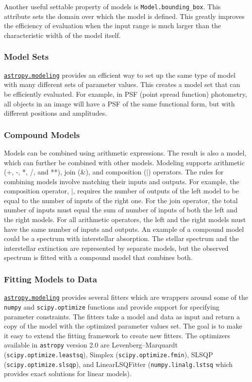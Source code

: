 \documentclass[modern]{aastex62}
\newcommand{\package}[1]{\texttt{#1}\xspace}
\newcommand{\astropypkg}{\package{astropy}}
\newcommand{\astropysubpkg}[1]{\href{http://docs.astropy.org/en/stable/#1/index.html}{\texttt{astropy.#1}}\xspace}
\begin{document}
Another useful settable property of models is \texttt{Model.bounding\_box}. This attribute sets the domain over which the model is defined. This greatly improves the efficiency of evaluation when the input range is much larger than the characteristic width of the model itself.

\subsubsection{Model Sets}

\astropysubpkg{modeling} provides an efficient way to set up the same type of model with many different sets of parameter values.
This creates a model set that can be efficiently evaluated. For example, in PSF (point spread function) photometry, all objects in an image will have a PSF of the same functional form, but with different positions and amplitudes.

\subsubsection{Compound Models}
Models can be combined using arithmetic expressions. The result is also a model, which can further be combined with other models. Modeling supports arithmetic (+, -, *, /, and **), join ($\&$), and composition ($|$) operators. The rules for combining models involve matching their inputs and outputs. For example, the composition operator, $|$, requires the number of outputs of the left model to be equal to the number of inputs of the right one. For the join operator, the total number of inputs must equal the sum of number of inputs of both the left and the right models. For all arithmetic operators, the left and the right models must have the same number of inputs and outputs. An example of a compound model could be a spectrum with interstellar absorption. The stellar spectrum and the interstellar extinction are represented by separate models, but the observed spectrum is fitted with a compound model that combines both.

\subsubsection{Fitting Models to Data}

\astropysubpkg{modeling} provides several fitters which are wrappers around some of the \texttt{numpy} and \texttt{scipy.optimize} functions and provide support for specifying parameter constraints. The fitters take a model and data as input and return a copy of the model with the optimized parameter values set. The goal is to make it easy to extend the fitting framework to create new fitters. The optimizers available in \astropypkg version 2.0 are Levenberg--Marquardt (\texttt{scipy.optimize.leastsq}), Simplex (\texttt{scipy.optimize.fmin}), SLSQP (\texttt{scipy.optimize.slsqp}), and LinearLSQFitter (\texttt{numpy.linalg.lstsq} which provides exact solutions for linear models).
\end{document}
